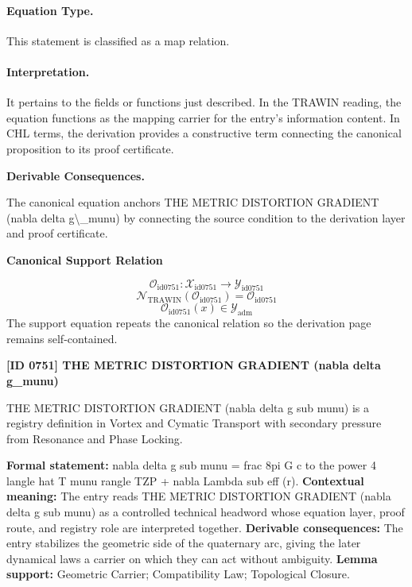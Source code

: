 \paragraph{Equation Type.}
This statement is classified as a map relation.

\paragraph{Interpretation.}
It pertains to the fields or functions just described. In the TRAWIN reading, the equation functions as the mapping carrier for the entry’s information content. In CHL terms, the derivation provides a constructive term connecting the canonical proposition to its proof certificate.

\par\vspace{0.35em}
\noindent\textbf{Derivable Consequences.}\quad
\begingroup
\footnotesize
\raggedright
The canonical equation anchors THE METRIC DISTORTION GRADIENT (nabla delta g\textbackslash{}\_munu) by connecting the source condition to the derivation layer and proof certificate.
\par\endgroup

\noindent\textbf{Canonical Support Relation}\par
\[
\mathcal{O}_{\mathrm{id0751}}:\mathcal{X}_{\mathrm{id0751}}\longrightarrow\mathcal{Y}_{\mathrm{id0751}}
\]
\[
\mathcal{N}_{\mathrm{TRAWIN}}(\mathcal{O}_{\mathrm{id0751}})=\mathcal{O}_{\mathrm{id0751}}
\]
\[
\mathcal{O}_{\mathrm{id0751}}(x)\in\mathcal{Y}_{\mathrm{adm}}
\]
\noindent The support equation repeats the canonical relation so the derivation page remains self-contained.\par

\clearpage
\noindent\textbf{[ID 0751] THE METRIC DISTORTION GRADIENT (nabla delta g\_munu)}\par
\vspace{0.35em}
\begingroup\small
{}
THE METRIC DISTORTION GRADIENT (nabla delta g sub munu) is a registry definition in Vortex and Cymatic Transport with secondary pressure from Resonance and Phase Locking.

\begingroup\footnotesize\setlength{\emergencystretch}{3em}\sloppy
\textbf{Formal statement:} nabla delta g sub munu = frac 8pi G c to the power 4 langle hat T munu rangle TZP + nabla Lambda sub eff (r). \textbf{Contextual meaning:} The entry reads THE METRIC DISTORTION GRADIENT (nabla delta g sub munu) as a controlled technical headword whose equation layer, proof route, and registry role are interpreted together. \textbf{Derivable consequences:} The entry stabilizes the geometric side of the quaternary arc, giving the later dynamical laws a carrier on which they can act without ambiguity. \textbf{Lemma support:} Geometric Carrier; Compatibility Law; Topological Closure.\par
\endgroup

